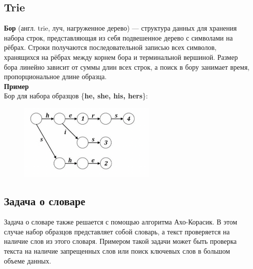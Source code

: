     \subsection{Trie}
        \textbf{Бор} (англ. trie, луч, нагруженное дерево) — структура данных для хранения набора строк, представляющая из себя подвешенное дерево с символами на рёбрах. Строки получаются последовательной записью всех символов, хранящихся на рёбрах между корнем бора и терминальной вершиной. Размер бора линейно зависит от суммы длин всех строк, а поиск в бору занимает время, пропорциональное длине образца.\\
    
        \textbf{Пример}\\
        Бор для набора образцов \{\textbf{he, she, his, hers}\}:
        \begin{figure}[H]
                    \centering
                    \includegraphics[width=0.6\textwidth]{images/chapter9/trie.png}
                    \label{fig:images/chapter9/trie.png}
        \end{figure}

    \subsection{Задача о словаре}
        Задача о словаре также решается с помощью алгоритма Ахо-Корасик. В этом случае набор образцов представляет собой словарь, а текст проверяется на наличие слов из этого словаря.
        Примером такой задачи может быть проверка текста на наличие запрещенных слов или поиск ключевых слов в большом объеме данных.

